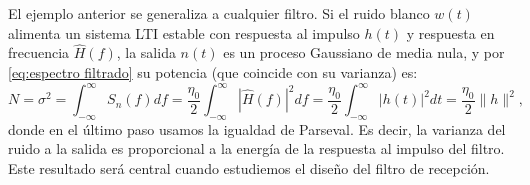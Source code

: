 El ejemplo anterior se generaliza a cualquier filtro. Si el ruido blanco $w(t)$ alimenta un sistema LTI estable con respuesta al impulso $h(t)$ y respuesta en frecuencia $\hat{H}(f)$, la salida $n(t)$ es un proceso Gaussiano de media nula, y por \eqref{eq:espectro filtrado} su potencia (que coincide con su varianza) es:
\begin{equation}\label{eq:potencia ruido filtrado}
    N = \sigma^2 = \int_{-\infty}^\infty S_n(f)df = \frac{\eta_0}{2}\int_{-\infty}^\infty |\hat{H}(f)|^2 df = \frac{\eta_0}{2}\int_{-\infty}^\infty |h(t)|^2 dt = \frac{\eta_0}{2}\|h\|^2,
\end{equation}
donde en el último paso usamos la igualdad de Parseval. Es decir, la varianza del ruido a la salida es proporcional a la energía de la respuesta al impulso del filtro. Este resultado será central cuando estudiemos el diseño del filtro de recepción.
